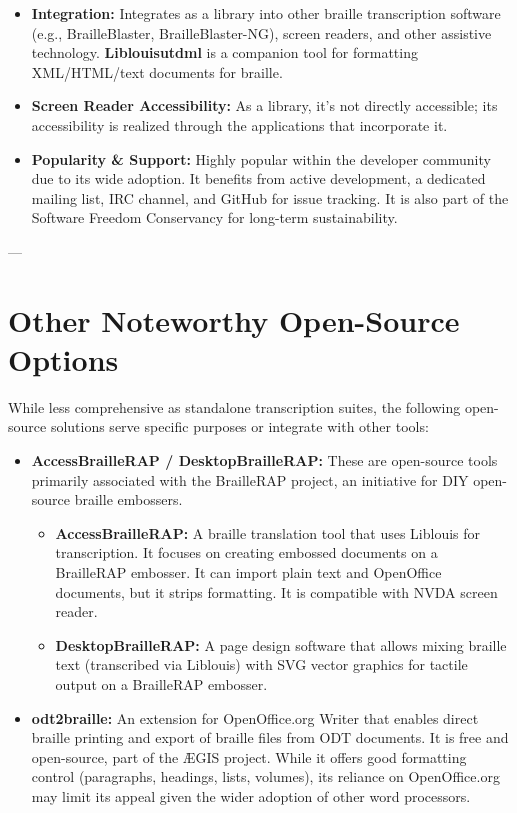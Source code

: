 \begin{itemize}
\begin{itemize}
        \item \textbf{Integration:} Integrates as a library into other braille transcription software (e.g., BrailleBlaster, BrailleBlaster-NG), screen readers, and other assistive technology. \textbf{Liblouisutdml} is a companion tool for formatting XML/HTML/text documents for braille.
        \item \textbf{Screen Reader Accessibility:} As a library, it's not directly accessible; its accessibility is realized through the applications that incorporate it.
        \item \textbf{Popularity & Support:} Highly popular within the developer community due to its wide adoption. It benefits from active development, a dedicated mailing list, IRC channel, and GitHub for issue tracking. It is also part of the Software Freedom Conservancy for long-term sustainability.
    \end{itemize}
\end{itemize}

---

\section{Other Noteworthy Open-Source Options}
While less comprehensive as standalone transcription suites, the following open-source solutions serve specific purposes or integrate with other tools:

\begin{itemize}
    \item \textbf{AccessBrailleRAP / DesktopBrailleRAP:} These are open-source tools primarily associated with the BrailleRAP project, an initiative for DIY open-source braille embossers.
    \begin{itemize}
        \item \textbf{AccessBrailleRAP:} A braille translation tool that uses Liblouis for transcription. It focuses on creating embossed documents on a BrailleRAP embosser. It can import plain text and OpenOffice documents, but it strips formatting. It is compatible with NVDA screen reader\footnotemark{}.
        \item \textbf{DesktopBrailleRAP:} A page design software that allows mixing braille text (transcribed via Liblouis) with SVG vector graphics for tactile output on a BrailleRAP embosser\footnotemark{}.
    \end{itemize}
    \item \textbf{odt2braille:} An extension for OpenOffice.org Writer that enables direct braille printing and export of braille files from ODT documents. It is free and open-source, part of the ÆGIS project. While it offers good formatting control (paragraphs, headings, lists, volumes), its reliance on OpenOffice.org may limit its appeal given the wider adoption of other word processors\footnotemark{}.
\end{itemize}

